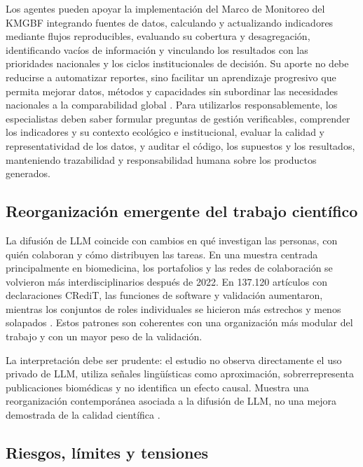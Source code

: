 \documentclass[11pt,a4paper]{article}
\begin{document}
Los agentes pueden apoyar la implementación del Marco de Monitoreo del KMGBF integrando 
fuentes de datos, calculando y actualizando indicadores mediante flujos reproducibles, 
evaluando su cobertura y desagregación, identificando vacíos de información y vinculando 
los resultados con las prioridades nacionales y los ciclos institucionales de decisión. 
Su aporte no debe reducirse a automatizar reportes, sino facilitar un aprendizaje progresivo 
que permita mejorar datos, métodos y capacidades sin subordinar las necesidades nacionales 
a la comparabilidad global \citep{affinito2024monitoring,affinito2025coverage}. Para 
utilizarlos responsablemente, los especialistas deben saber formular preguntas de gestión 
verificables, comprender los indicadores y su contexto ecológico e institucional, evaluar 
la calidad y representatividad de los datos, y auditar el código, los supuestos y los resultados, 
manteniendo trazabilidad y responsabilidad humana sobre los productos generados.

\subsection{Reorganización emergente del trabajo científico}

La difusión de LLM coincide con cambios en qué investigan las personas, con quién
colaboran y cómo distribuyen las tareas. En una muestra centrada principalmente en
biomedicina, los portafolios y las redes de colaboración se volvieron más
interdisciplinarios después de 2022. En 137.120 artículos con declaraciones CRediT,
las funciones de software y validación aumentaron, mientras los conjuntos de roles
individuales se hicieron más estrechos y menos solapados
\citep{zheng2026scientific}. Estos patrones son coherentes con una organización más
modular del trabajo y con un mayor peso de la validación.

La interpretación debe ser prudente: el estudio no observa directamente el uso
privado de LLM, utiliza señales lingüísticas como aproximación, sobrerrepresenta
publicaciones biomédicas y no identifica un efecto causal. Muestra una
reorganización contemporánea asociada a la difusión de LLM, no una mejora
demostrada de la calidad científica \citep{zheng2026scientific}.

\subsection{Riesgos, límites y tensiones}
\end{document}
